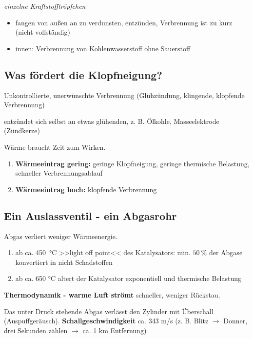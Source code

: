 \emph{einzelne Kraftstofftröpfchen}

\begin{itemize}
\item
  fangen von außen an zu verdunsten, entzünden, Verbrennung ist zu kurz
  (nicht vollständig)
\item
  innen: Verbrennung von Kohlenwasserstoff ohne Sauerstoff
\end{itemize}

\subsection{Was fördert die
Klopfneigung?}\label{was-foerdert-die-klopfneigung}

Unkontrollierte, unerwünschte Verbrennung (Glühzündung, klingende,
klopfende Verbrennung)

entzündet sich selbst an etwas glühenden, z. B. Ölkohle, Masseelektrode
(Zündkerze)

Wärme braucht Zeit zum Wirken.

\begin{enumerate}
\item
  \textbf{Wärmeeintrag gering:} geringe Klopfneigung, geringe thermische
  Belastung, schneller Verbrennungsablauf
\item
  \textbf{Wärmeeintrag hoch:} klopfende Verbrennung
\end{enumerate}

\subsection{Ein Auslassventil - ein
Abgasrohr}\label{ein-auslassventil-ein-abgasrohr}

Abgas verliert weniger Wärmeenergie.

\begin{enumerate}
\item
  ab ca. 450~°C >>light off point<< des Katalysators: min. $50~\%$ der
  Abgase konvertiert in nicht Schadstoffen
\item
  ab ca. 650 °C altert der Katalysator exponentiell und thermische
  Belastung
\end{enumerate}

\textbf{Thermodynamik - warme Luft strömt} schneller, weniger Rückstau.

Das unter Druck stehende Abgas verlässt den Zylinder mit Überschall
(Auspuffgeräusch). \textbf{Schallgeschwindigkeit} ca. 343 m/s (z. B.
Blitz $\to$ Donner, drei Sekunden zählen $\to$ ca. 1 km Entfernung)

